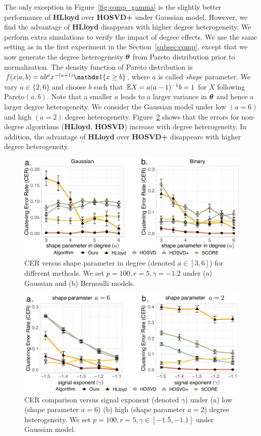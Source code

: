 \documentclass[lettersize,onecolumn,journal]{IEEEtran}
\theoremstyle{definition}
\theoremstyle{definition}
\begin{document}
The only exception in Figure~\ref{fig:comp_gamma} is the slightly better performance of \textbf{\small HLloyd} over \textbf{\small HOSVD+} under Gaussian model. However, we find the advantage of \textbf{\small HLloyd} disappears with higher degree heterogeneity. We perform extra simulations to verify the impact of degree effects. We use the same setting as in the first experiment in the Section~\ref{subsec:comp}, except that we now generate the degree heterogeneity $\boldsymbol{\theta}$ from Pareto distribution prior to normalization. The density function of Pareto distribution is $f(x|a,b) = a b^a x^{-(a+1)} \ind\{ x \geq b \}$, where $a$ is called \emph{shape} parameter. We vary $a \in \{2,6\}$ and choose $b$ such that $\mathbb{E} X = a(a - 1)^{-1}b = 1$ for $X$ following Pareto$(a,b)$. Note that a smaller $a$ leads to a larger variance in $\boldsymbol{\theta}$ and hence a larger degree heterogeneity. We consider the Gaussian model under low $(a = 6)$ and high $(a = 2)$ degree heterogeneity. Figure~\ref{fig:comp_gamma_theta} shows that the errors for non-degree algorithms (\textbf{\small HLloyd}, \textbf{\small HOSVD}) increase with degree heterogeneity. In addition, the advantage of \textbf{\small HLloyd} over \textbf{\small HOSVD+} disappears with higher degree heterogeneity. 



\begin{figure}[h!]
    \centering
    \includegraphics[width=.8\columnwidth]{comp_theta_anno3.pdf}
    \caption{CER versus shape parameter in degree (denoted $a\in[3,6]$) for different methods. We set $p = 100, r = 5, \gamma = -1.2$ under (a) Gaussian and (b) Bernoulli models.}
    \label{fig:comp_theta}
\end{figure}



\begin{figure}[htp!]
    \centering
    \includegraphics[width=.8\columnwidth]{comp_gamma_theta3.pdf}
    \caption{CER comparison versus signal exponent (denoted $\gamma$) under (a) low (shape parameter $a = 6$)  (b) high (shape parameter $a = 2$) degree heterogeneity. We set $p = 100, r = 5, \gamma \in [-1.5, -1.1]$ under Gaussian model.}
    \label{fig:comp_gamma_theta}
\end{figure}
\end{document}
